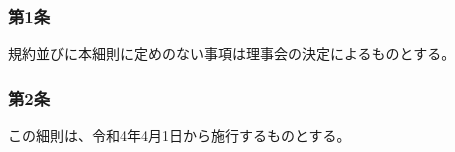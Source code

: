 \documentclass[12pt,uplatex]{jsarticle}
\begin{document}
\subsubsection*{第1条}
規約並びに本細則に定めのない事項は理事会の決定によるものとする。
\subsubsection*{第2条}
この細則は、令和4年4月1日から施行するものとする。


\setlength{\arrayrulewidth}{0.2pt}

\newpage
\end{document}
